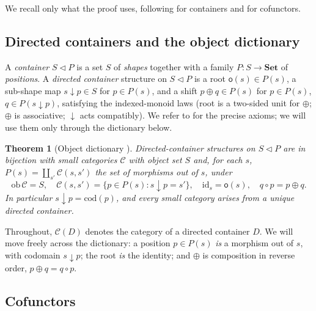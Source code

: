 \documentclass[11pt,a4paper]{amsart}
\newcommand{\Set}{\mathbf{Set}}
\newcommand{\cont}[2]{#1 \triangleleft #2}
\newcommand{\id}{\mathrm{id}}
\newcommand{\cod}{\mathrm{cod}}
\newcommand{\ob}{\mathrm{ob}\,}
\theoremstyle{plain}
\newtheorem{theorem}{Theorem}[section]
\theoremstyle{definition}
\theoremstyle{remark}
\begin{document}
We recall only what the proof uses, following \cite{ACU14,AU16} for containers and
\cite{Aguiar,Clarke20} for cofunctors.

\subsection{Directed containers and the object dictionary}

A \emph{container} $\cont SP$ is a set $S$ of \emph{shapes} together with a family
$P\colon S\to\Set$ of \emph{positions}. A \emph{directed container} structure on
$\cont SP$ is a root $\mathsf o(s)\in P(s)$, a sub-shape map $s\downarrow p\in S$ for
$p\in P(s)$, and a shift $p\oplus q\in P(s)$ for $p\in P(s)$, $q\in P(s\downarrow p)$,
satisfying the indexed-monoid laws (root is a two-sided unit for $\oplus$; $\oplus$ is
associative; $\downarrow$ acts compatibly). We refer to \cite{AU16} for the precise
axioms; we will use them only through the dictionary below.

\begin{theorem}[Object dictionary \cite{AU16}]\label{thm:obj}
Directed-container structures on $\cont SP$ are in bijection with small categories
$\mathcal C$ with object set $S$ and, for each $s$, $P(s)=\coprod_{s'}\mathcal C(s,s')$
the set of morphisms out of $s$, under
\[
  \ob\mathcal C=S,\quad
  \mathcal C(s,s')=\{p\in P(s): s\downarrow p=s'\},\quad
  \id_s=\mathsf o(s),\quad
  q\circ p = p\oplus q .
\]
In particular $s\downarrow p=\cod(p)$, and every small category arises from a unique
directed container.
\end{theorem}

Throughout, $\mathcal C(D)$ denotes the category of a directed container $D$. We will
move freely across the dictionary: a position $p\in P(s)$ \emph{is} a morphism out of
$s$, with codomain $s\downarrow p$; the root \emph{is} the identity; and $\oplus$ is
composition in reverse order, $p\oplus q = q\circ p$.

\subsection{Cofunctors}
\end{document}
